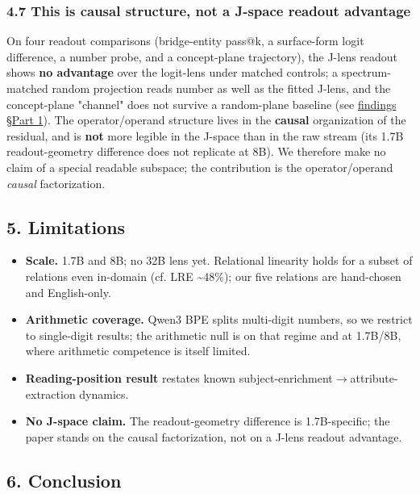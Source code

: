 \subsubsection{4.7 This is causal structure, not a J-space readout
advantage}\label{47-this-is-causal-structure-not-a-j-space-readout-advantage}

On four readout comparisons (bridge-entity pass@k, a surface-form logit
difference, a number probe, and a concept-plane trajectory), the J-lens
readout shows \textbf{no advantage} over the logit-lens under matched
controls; a spectrum-matched random projection reads number as well as
the fitted J-lens, and the concept-plane "channel" does not survive a
random-plane baseline (see \href{findings.md}{findings \S{}Part 1}). The
operator/operand structure lives in the \textbf{causal} organization of
the residual, and is \textbf{not} more legible in the J-space than in
the raw stream (its 1.7B readout-geometry difference does not replicate
at 8B). We therefore make no claim of a special readable subspace; the
contribution is the operator/operand \emph{causal} factorization.

\subsection{5. Limitations}\label{5-limitations}

\begin{itemize}
\tightlist
\item
  \textbf{Scale.} 1.7B and 8B; no 32B lens yet. Relational linearity
  holds for a subset of relations even in-domain (cf. LRE
  \textasciitilde48\%); our five relations are hand-chosen and
  English-only.
\item
  \textbf{Arithmetic coverage.} Qwen3 BPE splits multi-digit numbers, so
  we restrict to single-digit results; the arithmetic null is on that
  regime and at 1.7B/8B, where arithmetic competence is itself limited.
\item
  \textbf{Reading-position result} restates known
  subject-enrichment\ensuremath{\to}attribute-extraction dynamics.
\item
  \textbf{No J-space claim.} The readout-geometry difference is
  1.7B-specific; the paper stands on the causal factorization, not on a
  J-lens readout advantage.
\end{itemize}

\subsection{6. Conclusion}\label{6-conclusion}

